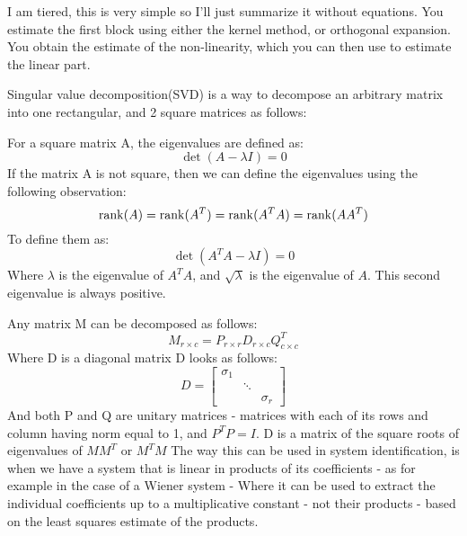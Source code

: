 {

    I am tiered, this is very simple so I'll just summarize it without equations. You estimate the first block using either the kernel method, or orthogonal expansion. You obtain the estimate of the non-linearity, which you can then use to estimate the linear part.

}

{
    Singular value decomposition(SVD) is a way to decompose an arbitrary matrix into one rectangular, and 2 square matrices as follows:

{
    For a square matrix A, the eigenvalues are defined as:
    \begin{equation}
        \det(A-\lambda I) = 0
    \end{equation}
    If the matrix A is not square, then we can define the eigenvalues using the following observation:
    \begin{equation}
        \operatorname{rank}(A) = \operatorname{rank}(A^{T}) = \operatorname{rank}(A^{T}A) = \operatorname{rank}(AA^{T})
    \end{equation}
    To define them as:
    \begin{equation}
        \det(A^{T}A - \lambda I) = 0
    \end{equation}
    Where $\lambda$ is the eigenvalue of  $A^{T}A$, and $\sqrt{\lambda}$ is the eigenvalue of  $A$. This second eigenvalue is always positive.
}


{
    Any matrix M can be decomposed as follows:
    \begin{equation}
        M_{r\times c} = P_{r\times r} D_{r\times c} Q^{T}_{c\times c}
    \end{equation}
    Where D is a diagonal matrix D looks as follows:
    \begin{equation}
        D = \begin{bmatrix}
            \sigma_1 & & \\
                     & \ddots & \\
                     & & \sigma_r
        \end{bmatrix}
    \end{equation}
    And both P and Q  are unitary matrices - matrices with each of its rows and column having norm equal to 1, and $P^{T}P = I$.
  D is a matrix of the square roots of eigenvalues of  $MM^{T}$ or $M^{T}M$
}
The way this can be used in system identification, is when we have a system that is linear in products of its coefficients - as for example in the case of a Wiener system - Where it can be used to extract the individual coefficients up to a multiplicative constant - not their products - based on the least squares estimate of the products.


}
